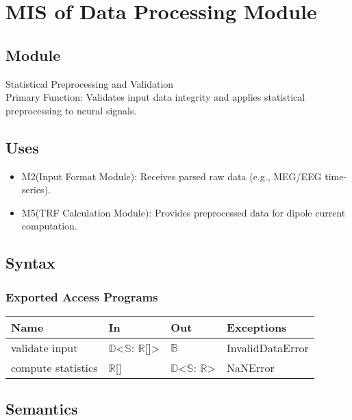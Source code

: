 \documentclass[12pt, titlepage]{article}
\begin{document}
\section{MIS of Data Processing Module}

\subsection{Module}

Statistical Preprocessing and Validation\\
Primary Function: Validates input data integrity and applies statistical preprocessing to neural signals.
\subsection{Uses}

\begin{itemize}
\item M2(Input Format Module): Receives parsed raw data (e.g., MEG/EEG time-series).


\item M5(TRF Calculation Module): Provides preprocessed data for dipole current computation.


\end{itemize}



\subsection{Syntax}


\subsubsection{Exported Access Programs}

\begin{center}
\begin{tabular}{p{2cm} p{4cm} p{4cm} p{2cm}}
\hline
\textbf{Name} & \textbf{In} & \textbf{Out} & \textbf{Exceptions} \\
\hline
validate input & $\mathbb{D}$<$\mathbb{S}$: $\mathbb{R}$[]> & $\mathbb{B}$ & InvalidDataError \\
compute statistics & $\mathbb{R}$[] & $\mathbb{D}$<$\mathbb{S}$: $\mathbb{R}$> & NaNError \\

\hline
\end{tabular}
\end{center}

\subsection{Semantics}
\end{document}
